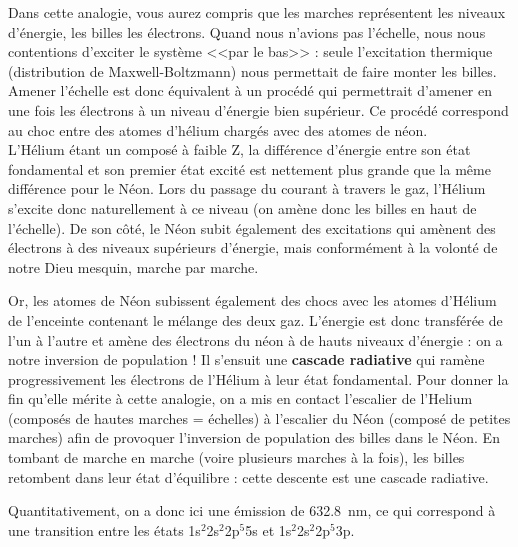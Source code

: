 Dans cette analogie, vous aurez compris que les marches représentent les niveaux d'énergie, les billes les électrons. Quand nous n'avions pas l'échelle, nous nous contentions d'exciter le système <<par le bas>> : seule l'excitation thermique (distribution de Maxwell-Boltzmann) nous permettait de faire monter les billes. Amener l'échelle est donc équivalent à un procédé qui permettrait d'amener en une fois les électrons à un niveau d'énergie bien supérieur. Ce procédé correspond au choc entre des atomes d'hélium chargés avec des atomes de néon.\\

L'Hélium étant un composé à faible Z, la différence d'énergie entre son état fondamental et son premier état excité est nettement plus grande que la même différence pour le Néon. Lors du passage du courant à travers le gaz, l'Hélium s'excite donc naturellement à ce niveau (on amène donc les billes en haut de l'échelle). De son côté, le Néon subit également des excitations qui amènent des électrons à des niveaux supérieurs d'énergie, mais conformément à la volonté de notre Dieu mesquin, marche par marche.

Or, les atomes de Néon subissent également des chocs avec les atomes d'Hélium de l'enceinte contenant le mélange des deux gaz. L'énergie est donc transférée de l'un à l'autre et amène des électrons du néon à de hauts niveaux d'énergie : on a notre inversion de population ! Il s'ensuit une \textbf{cascade radiative} qui ramène progressivement les électrons de l'Hélium à leur état fondamental. Pour donner la fin qu'elle mérite à cette analogie, on a mis en contact l'escalier de l'Helium (composés de hautes marches = échelles) à l'escalier du Néon (composé de petites marches) afin de provoquer l'inversion de population des billes dans le Néon. En tombant de marche en marche (voire plusieurs marches à la fois), les billes retombent dans leur état d'équilibre : cette descente est une cascade radiative.

Quantitativement, on a donc ici une émission de \SI{632.8}{nm}, ce qui correspond à une transition entre les états 1s$^2$2s$^2$2p$^5$5s et 1s$^2$2s$^2$2p$^5$3p.

